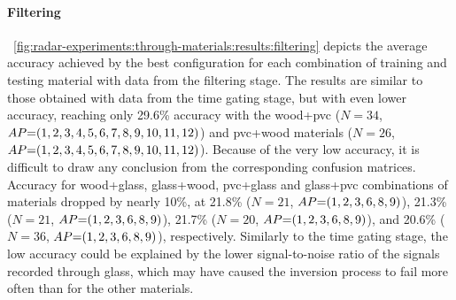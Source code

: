 \paragraph{Filtering}
\fig~\ref{fig:radar-experiments:through-materials:results:filtering} depicts the average accuracy achieved by the best configuration for each combination of training and testing material with data from the filtering stage.
The results are similar to those obtained with data from the time gating stage, but with even lower accuracy, reaching only 29.6\% accuracy with the wood+pvc ($N{=}34$, $\splitatcommas{AP{=}(1, 2, 3, 4, 5, 6, 7, 8, 9, 10, 11, 12)}$) and pvc+wood materials ($N{=}26$, $\splitatcommas{AP{=}(1, 2, 3, 4, 5, 6, 7, 8, 9, 10, 11, 12)}$).
%
Because of the very low accuracy, it is difficult to draw any conclusion from the corresponding confusion matrices.
Accuracy for wood+glass, glass+wood, pvc+glass and glass+pvc combinations of materials dropped by nearly 10\%, at 21.8\% ($N{=}21$, $\splitatcommas{AP{=}(1, 2, 3, 6, 8, 9)}$), 21.3\% ($N{=}21$, $\splitatcommas{AP{=}(1, 2, 3, 6, 8, 9)}$), 21.7\% ($N{=}20$, $\splitatcommas{AP{=}(1, 2, 3, 6, 8, 9)}$), and 20.6\% ($N{=}36$, $\splitatcommas{AP{=}(1, 2, 3, 6, 8, 9)}$), respectively.
%
Similarly to the time gating stage, the low accuracy could be explained by the lower signal-to-noise ratio of the signals recorded through glass, which may have caused the inversion process to fail more often than for the other materials.


